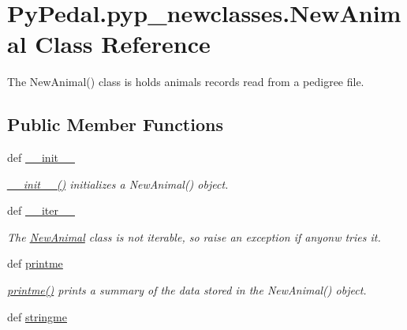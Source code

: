 \hypertarget{classPyPedal_1_1pyp__newclasses_1_1NewAnimal}{
\section{PyPedal.pyp\_\-newclasses.NewAnimal Class Reference}
\label{classPyPedal_1_1pyp__newclasses_1_1NewAnimal}
}


The NewAnimal() class is holds animals records read from a pedigree file.  


\subsection*{Public Member Functions}
\begin{DoxyCompactItemize}
\item 
def \hyperlink{classPyPedal_1_1pyp__newclasses_1_1NewAnimal_ab0d4dd46ff0e2683c670c36a270aba48}{\_\-\_\-init\_\-\_\-}
\begin{DoxyCompactList}\small\item\em \hyperlink{classPyPedal_1_1pyp__newclasses_1_1NewAnimal_ab0d4dd46ff0e2683c670c36a270aba48}{\_\-\_\-init\_\-\_\-()} initializes a NewAnimal() object. \item\end{DoxyCompactList}\item 
def \hyperlink{classPyPedal_1_1pyp__newclasses_1_1NewAnimal_a1fcb3af402b8a9a0f8779d8c466300c2}{\_\-\_\-iter\_\-\_\-}
\begin{DoxyCompactList}\small\item\em The \hyperlink{classPyPedal_1_1pyp__newclasses_1_1NewAnimal}{NewAnimal} class is not iterable, so raise an exception if anyonw tries it. \item\end{DoxyCompactList}\item 
def \hyperlink{classPyPedal_1_1pyp__newclasses_1_1NewAnimal_aa3dbef8ded04c8e33c2d4f45fb98773a}{printme}
\begin{DoxyCompactList}\small\item\em \hyperlink{classPyPedal_1_1pyp__newclasses_1_1NewAnimal_aa3dbef8ded04c8e33c2d4f45fb98773a}{printme()} prints a summary of the data stored in the NewAnimal() object. \item\end{DoxyCompactList}\item 
def \hyperlink{classPyPedal_1_1pyp__newclasses_1_1NewAnimal_ab2618a6a1bf2fac243a19799e60b5195}{stringme}

\end{DoxyCompactItemize}
